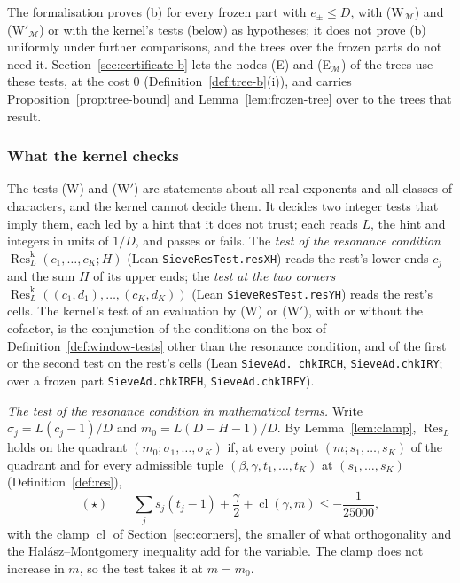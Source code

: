 \documentclass[11pt]{article}
\theoremstyle{definition}
\newcommand{\lean}[1]{\texttt{#1}}
\begin{document}
The formalisation proves (b) for every frozen part with $e_\pm \le D$, with (W$_{\mathcal M}$) and (W$'_{\mathcal M}$)
or with the kernel's tests (below) as hypotheses; it does not prove (b) uniformly under further comparisons, and the
trees over the frozen parts do not need it. Section~\ref{sec:certificate-b} lets the nodes (E) and (E$_{\mathcal M}$) of
the trees use these tests, at the cost $0$ (Definition~\ref{def:tree-b}(i)), and carries
Proposition~\ref{prop:tree-bound} and Lemma~\ref{lem:frozen-tree} over to the trees that result.

\subsubsection*{What the kernel checks}

The tests (W) and (W$'$) are statements about all real exponents and all classes of characters, and the kernel cannot
decide them. It decides two integer tests that imply them, each led by a hint that it does not trust; each reads $L$,
the hint and integers in units of $1/D$, and passes or fails. The
\emph{test of the resonance condition} $\operatorname{Res}^{\mathrm k}_L(c_1, \dots, c_K; H)$ (Lean
\lean{SieveResTest.\allowbreak resXH}) reads the rest's lower ends $c_j$ and the sum $H$ of its upper ends; the
\emph{test at the two corners} $\operatorname{Res}^{\mathrm k}_L((c_1, d_1), \dots, (c_K, d_K))$ (Lean
\lean{SieveResTest.\allowbreak resYH}) reads the rest's cells. The kernel's test of an evaluation by (W) or (W$'$), with
or without the cofactor, is the conjunction of the conditions on the box of Definition~\ref{def:window-tests} other than
the resonance condition, and of the first or the second test on the rest's cells (Lean \lean{SieveAd.\allowbreak
chkIRCH}, \lean{SieveAd.\allowbreak chkIRY}; over a frozen part \lean{SieveAd.\allowbreak chkIRFH},
\lean{SieveAd.\allowbreak chkIRFY}).

\emph{The test of the resonance condition in mathematical terms.} Write $\sigma_j = L(c_j - 1)/D$ and
$m_0 = L(D - H - 1)/D$. By
Lemma~\ref{lem:clamp}, $\operatorname{Res}_L$ holds on the quadrant $(m_0; \sigma_1, \dots, \sigma_K)$ if, at every
point $(m; s_1, \dots, s_K)$ of the quadrant and for every admissible tuple $(\beta, \gamma, t_1, \dots, t_K)$ at
$(s_1, \dots, s_K)$ (Definition~\ref{def:res}),
\[
  (\star) \qquad \sum_j s_j(t_j - 1) + \frac\gamma2 + \operatorname{cl}(\gamma, m) \le -\frac1{25000},
\]
with the clamp $\operatorname{cl}$ of Section~\ref{sec:corners}, the smaller of what orthogonality and the
Hal\'asz--Montgomery inequality add for the variable. The clamp does not increase in $m$, so the test takes it at $m =
m_0$.
\end{document}

